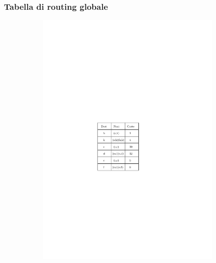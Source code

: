 \documentclass[10pt,xcolor=dvipsnames]{beamer}
\begin{document}
\begin{frame}
	\frametitle{Tabella di routing globale}
	
	\begin{figure}[h]
	\centering
		\begin{subfigure}[b]{0.35\textwidth}
		\includegraphics[scale=0.8]{routing_table_global.pdf}
		\end{subfigure}
		\begin{subfigure}[b]{0.6\textwidth}

\end{subfigure}
\end{figure}
\end{frame}
\end{document}
